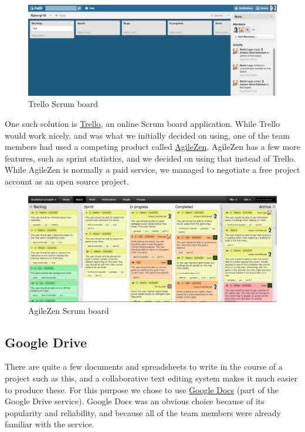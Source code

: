     \begin{figure}[htb]
      \centering
      \includegraphics[width=1\textwidth]{pictures/trello.png}
      \caption{Trello Scrum board}
    \end{figure}

    One such solution is \href{https://trello.com}{Trello}, an online Scrum
    board application. While Trello would work nicely, and was what we initially
    decided on using, one of the team members had used a competing product called
    \href{http://www.agilezen.com/}{AgileZen}. AgileZen has a few more features,
    such as sprint statistics, and we decided on using that instead of Trello.
    While AgileZen is normally a paid service, we managed to negotiate a free
    project account as an open source project.

    \begin{figure}[htb]
      \centering
      \includegraphics[width=1\textwidth]{pictures/agilezen2.png}
      \caption{AgileZen Scrum board}
    \end{figure}

\subsection{Google Drive}
    There are quite a few documents and spreadsheets to write in the course
    of a project such as this, and a collaborative text editing system
    makes it much easier to produce these. For this purpose we chose to use
    \href{https://drive.google.com}{Google Docs} (part of the Google Drive
    service). Google Docs was an obvious choice because of its popularity and
    reliability, and because all of the team members were already familiar with the
    service.

